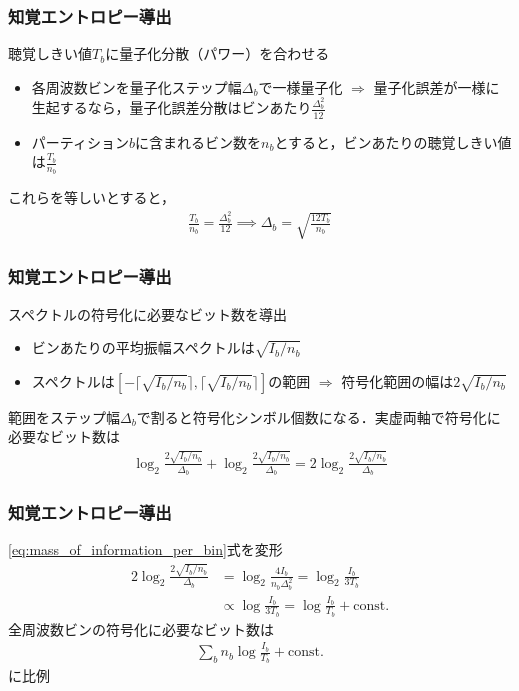 \documentclass[14pt,xcolor=dvipsnames,table,dvipdfmx]{beamer}
\begin{document}
\begin{frame}[c]
    \frametitle{知覚エントロピー導出}
    聴覚しきい値$T_{b}$に量子化分散（パワー）を合わせる
    \begin{itemize}
        \item 各周波数ビンを量子化ステップ幅$\Delta_{b}$で一様量子化 $\Rightarrow$ 量子化誤差が一様に生起するなら，量子化誤差分散はビンあたり$\frac{\Delta_{b}^{2}}{12}$
        \item パーティション$b$に含まれるビン数を$n_{b}$とすると，ビンあたりの聴覚しきい値は$\frac{T_{b}}{n_{b}}$
    \end{itemize}
    これらを等しいとすると，
    \begin{align}
        \frac{T_{b}}{n_{b}} = \frac{\Delta_{b}^{2}}{12} \implies \Delta_{b} = \sqrt{\frac{12T_{b}}{n_{b}}}
    \end{align}
\end{frame}

\begin{frame}[c]
    \frametitle{知覚エントロピー導出}
    スペクトルの符号化に必要なビット数を導出
    \begin{itemize}
        \item ビンあたりの平均振幅スペクトルは$\sqrt{I_{b} / n_{b}}$
        \item スペクトルは$[- \lceil \sqrt{I_{b} / n_{b}} \rceil, \lceil \sqrt{I_{b} / n_{b}} \rceil]$の範囲 $\Rightarrow$ 符号化範囲の幅は$2\sqrt{I_{b} / n_{b}}$
    \end{itemize}
    範囲をステップ幅$\Delta_{b}$で割ると符号化シンボル個数になる．実虚両軸で符号化に必要なビット数は
    \begin{align}
        \log_{2} \frac{2 \sqrt{I_{b} / n_{b}}}{\Delta_{b}} + \log_{2} \frac{2 \sqrt{I_{b} / n_{b}}}{\Delta_{b}} = 2\log_{2} \frac{2 \sqrt{I_{b} / n_{b}}}{\Delta_{b}} \label{eq:mass_of_information_per_bin}
    \end{align}
\end{frame}

\begin{frame}[c]
    \frametitle{知覚エントロピー導出}
    \eqref{eq:mass_of_information_per_bin}式を変形
    \begin{align*}
        2\log_{2} \frac{2 \sqrt{I_{b} / n_{b}}}{\Delta_{b}} &= \log_{2} \frac{4 I_{b}}{n_{b} \Delta_{b}^{2}} = \log_{2} \frac{I_{b}}{3T_{b}} \\
        &\propto \log \frac{I_{b}}{3T_{b}} = \log \frac{I_{b}}{T_{b}} + \mathrm{const.}
    \end{align*}
    全周波数ビンの符号化に必要なビット数は
    \begin{align}
        \sum_{b} n_{b} \log \frac{I_{b}}{T_{b}} + \mathrm{const.}
    \end{align}
    に比例
\end{frame}
\end{document}
